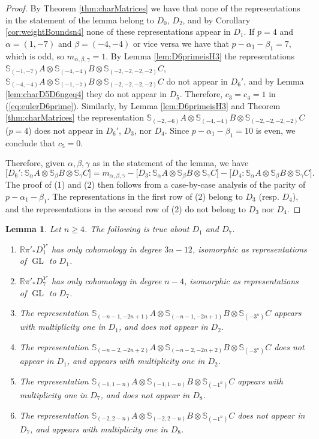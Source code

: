 \documentclass[11pt,reqno]{amsart}
\newcommand{\oo}{\otimes}
\newcommand{\bS}{\mathbb{S}}
\newcommand{\GL}{\operatorname{GL}}
\newtheorem{lemma}[theorem]{Lemma}
\numberwithin{equation}{section}
\begin{document}
\begin{proof}
By Theorem \ref{thm:charMatrices} we have that none of the representations in the statement of the lemma belong to $D_0$, $D_2$, and by Corollary \ref{cor:weightBoundsn4} none of these representations appear in $D_1$. If $p=4$ and $\alpha=(1,-7)$ and $\beta=(-4,-4)$ or vice versa we have  that $p-\alpha_1-\beta_1=7$, which is odd, so $m_{\alpha,\beta, \gamma}=1$. By Lemma \ref{lem:D6primeisH3} the representations $\bS_{(-1,-7)}A\oo \bS_{(-4,-4)}B\oo \bS_{(-2,-2,-2,-2)}C$, $\bS_{(-4,-4)}A\oo \bS_{(-1,-7)}B\oo \bS_{(-2,-2,-2,-2)}C$ do not appear in $D_6'$, and by Lemma \ref{lem:charD5D6ngeq4} they do not appear in $D_5$. Therefore, $c_3=c_4=1$ in (\ref{eq:eulerD6prime}). Similarly, by Lemma \ref{lem:D6primeisH3} and Theorem \ref{thm:charMatrices} the representation $\bS_{(-2,-6)}A\oo \bS_{(-4,-4)}B\oo \bS_{(-2,-2,-2,-2)}C$ ($p=4$) does not appear in $D_6'$, $D_3$, nor $D_4$. Since $p-\alpha_1-\beta_1=10$ is even, we conclude that $c_5=0$.

Therefore, given $\alpha,\beta, \gamma$ as in the statement of the lemma, we have
$$
\big[ D_6':\bS_{\alpha}A\oo \bS_{\beta}B\oo \bS_{\gamma}C\big]=m_{\alpha,\beta, \gamma}-\big[ D_3:\bS_{\alpha}A\oo \bS_{\beta}B\oo \bS_{\gamma}C\big]-\big[ D_4:\bS_{\alpha}A\oo \bS_{\beta}B\oo \bS_{\gamma}C\big].
$$
The proof of (1) and (2) then follows from a case-by-case analysis of the parity of $p-\alpha_1-\beta_1$. The representations in the first row of (2) belong to $D_3$ (resp. $D_4$), and the representations in the second row of (2) do not belong to $D_3$ nor $D_4$.
\end{proof}





\begin{lemma}\label{lem:directimD1}
Let $n\geq 4$. The following is true about $D_1$ and $D_7$.
\begin{enumerate}
\item $\mathbb{R}\pi'_{\ast}D_1^{Y'}$ has only cohomology in degree $3n-12$, isomorphic as representations of $\GL$ to $D_1$.
\item $\mathbb{R}\pi'_{\ast}D_7^{Y'}$ has only cohomology in degree $n-4$, isomorphic as representations of $\GL$ to $D_7$.	

\item The representation $\bS_{(-n-1,-2n+1)}A\oo \bS_{(-n-1,-2n+1)}B \oo \bS_{(-3^n)}C$ appears with multiplicity one in $D_1$, and does not appear in $D_2$.
\item The representation $\bS_{(-n-2,-2n+2)}A\oo \bS_{(-n-2,-2n+2)}B \oo \bS_{(-3^n)}C$ does not appear in $D_1$, and appears with multiplicity one in $D_2$.

\item The representation $\bS_{(-1,1-n)}A\oo \bS_{(-1,1-n)}B \oo \bS_{(-1^n)}C$ appears with multiplicity one in $D_7$, and does not appear in $D_8$.
\item The representation $\bS_{(-2,2-n)}A\oo \bS_{(-2,2-n)}B \oo \bS_{(-1^n)}C$ does not appear in $D_7$, and appears with multiplicity one in $D_8$.		
\end{enumerate}


\end{lemma}
\end{document}
